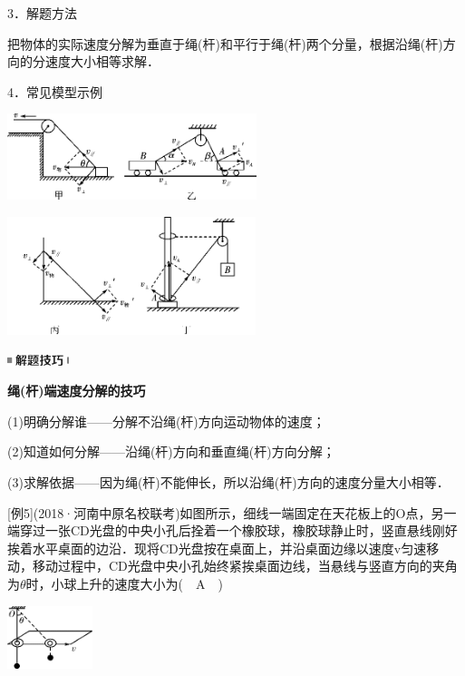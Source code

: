 3．解题方法

把物体的实际速度分解为垂直于绳(杆)和平行于绳(杆)两个分量，根据沿绳(杆)方向的分速度大小相等求解．

4．常见模型示例

\begin{center}\includegraphics[width=2.86458in,height=0.98958in]{media/image151.png}\end{center}
\begin{center}\includegraphics[width=2.85417in,height=1.35417in]{media/image152.png}\end{center}
\begin{center}\includegraphics[width=0.70833in,height=0.125in]{media/image37.png}

\textbf{绳(杆)端速度分解的技巧}
\end{center}


(1)明确分解谁------分解不沿绳(杆)方向运动物体的速度；

(2)知道如何分解------沿绳(杆)方向和垂直绳(杆)方向分解；

(3)求解依据------因为绳(杆)不能伸长，所以沿绳(杆)方向的速度分量大小相等．

{[}例5{]}(2018·河南中原名校联考)如图所示，细线一端固定在天花板上的O点，另一端穿过一张CD光盘的中央小孔后拴着一个橡胶球，橡胶球静止时，竖直悬线刚好挨着水平桌面的边沿．现将CD光盘按在桌面上，并沿桌面边缘以速度v匀速移动，移动过程中，CD光盘中央小孔始终紧挨桌面边线，当悬线与竖直方向的夹角为$\theta$时，小球上升的速度大小为(　A　)

\begin{center}\includegraphics[width=0.97917in,height=0.72917in]{media/image153.png}\end{center}

